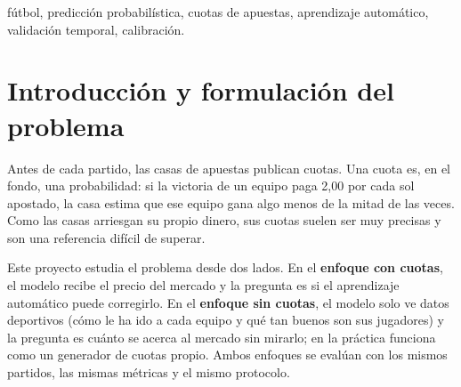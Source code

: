\documentclass[conference]{IEEEtran}
\begin{document}
\begin{abstract}
¿Se puede predecir el resultado de un partido de fútbol mejor que las casas de apuestas? Este trabajo estima la probabilidad de victoria local, empate y victoria visitante en 36.119 partidos de nueve ligas europeas, entre 2014/15 y 2025/26, con dos enfoques de igual importancia. El primero usa las cuotas de las casas como dato de entrada y pregunta si el aprendizaje automático puede mejorarlas. El segundo no mira las cuotas: construye la probabilidad solo con información deportiva (historial de resultados y valoraciones de jugadores del videojuego FIFA/FC) y mide qué tan cerca llega del mercado. Se comparan regresión logística, árboles potenciados, bosques aleatorios, redes neuronales, SVM y combinaciones de modelos, entrenando siempre con el pasado y evaluando en temporadas posteriores. La métrica principal es la pérdida logarítmica (log loss), que premia asignar probabilidades altas a lo que realmente ocurre. Con cuotas, una regresión logística sobre el precio mejora ligeramente al consenso de las casas (0{,}9652 frente a 0{,}9664 en validación y 0{,}9650 frente a 0{,}9668 en test). Sin cuotas, un promedio de modelos obtiene 0{,}9777 y 0{,}9791: recupera el 89{,}3\,\% de la ventaja que tiene el mercado sobre una predicción ingenua, sin llegar a superarlo. Ninguno de los dos enfoques demuestra ganancias estables en apuestas.
\end{abstract}
\begin{IEEEkeywords}
fútbol, predicción probabilística, cuotas de apuestas, aprendizaje automático, validación temporal, calibración.
\end{IEEEkeywords}

\section{Introducción y formulación del problema}
\label{sec:intro}
Antes de cada partido, las casas de apuestas publican cuotas. Una cuota es, en el fondo, una probabilidad: si la victoria de un equipo paga 2,00 por cada sol apostado, la casa estima que ese equipo gana algo menos de la mitad de las veces. Como las casas arriesgan su propio dinero, sus cuotas suelen ser muy precisas y son una referencia difícil de superar.

Este proyecto estudia el problema desde dos lados. En el \textbf{enfoque con cuotas}, el modelo recibe el precio del mercado y la pregunta es si el aprendizaje automático puede corregirlo. En el \textbf{enfoque sin cuotas}, el modelo solo ve datos deportivos (cómo le ha ido a cada equipo y qué tan buenos son sus jugadores) y la pregunta es cuánto se acerca al mercado sin mirarlo; en la práctica funciona como un generador de cuotas propio. Ambos enfoques se evalúan con los mismos partidos, las mismas métricas y el mismo protocolo.
\end{document}
